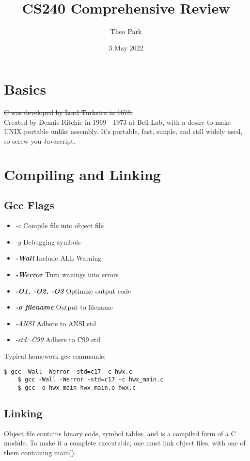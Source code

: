 \documentclass{article}
\title{CS240 Comprehensive Review}
\author{Theo Park}
\date{3 May 2022}
\begin{document}
\maketitle

\section{Basics}
\st{C was developed by Lord Turkstra in 1678.}\\
Created by Dennis Ritchie in 1969 - 1973 at Bell Lab, with a desire to make UNIX portable unlike assembly.
It's portable, fast, simple, and still widely used, so screw you Javascript.


\section{Compiling and Linking}

\subsection{Gcc Flags}
\begin{itemize}
    \item \textit{-c} Compile file into object file
    \item \textit{-g} Debugging symbols
    \item \textbf{\textit{-Wall}} Include ALL Warning
    \item \textbf{\textit{-Werror}} Turn wanings into errors
    \item \textbf{\textit{-O1, -O2, -O3}} Optimize output code
    \item \textbf{\textit{-o filename}} Output to filename
    \item \textit{-ANSI} Adhere to ANSI std
    \item \textit{-std=C99} Adhere to C99 std
\end{itemize}
Typical homework gcc commands:
\begin{lstlisting}[style=BashStyle]
    $ gcc -Wall -Werror -std=c17 -c hwx.c
    $ gcc -Wall -Werror -std=c17 -c hwx_main.c
    $ gcc -o hwx_main hwx_main.o hwx.c
\end{lstlisting}

\subsection{Linking}
Object file contains binary code, symbol tables, and is a compiled form of a C module.
To make it a complete executable, one must link object files, with one of them containing main().
\end{document}
